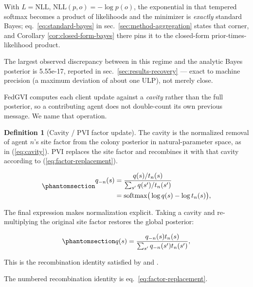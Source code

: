 \documentclass[
  english,
]{article}
\theoremstyle{plain}
\theoremstyle{definition}
\newtheorem{definition}[theorem]{Definition}
\theoremstyle{remark}
\theoremstyle{definition}
\begin{document}
With \(L=\mathrm{NLL}\), \(\mathrm{NLL}(p, o) = -\log p(o)\), the
exponential in that tempered softmax becomes a product of likelihoods
and the minimizer is \emph{exactly} standard Bayes;
eq.~\ref{eq:standard-bayes} in sec.~\ref{sec:method-aggregation} states
that corner, and Corollary \ref{cor:closed-form-bayes} there pins it to
the closed-form prior-times-likelihood product.

The largest observed discrepancy between 
in this regime and the analytic Bayes posterior is 5.55e-17, reported in
sec.~\ref{sec:results-recovery} --- exact to machine precision (a
maximum deviation of about one ULP), not merely close.

FedGVI computes each client update against a \emph{cavity} rather than
the full posterior, so a contributing agent does not double-count its
own previous message. We name that operation.

\begin{definition}[Cavity / PVI factor update]\label{def:cavity}
The cavity is the normalized removal of agent $n$'s site factor from the colony
posterior in natural-parameter space, as in (\ref{eq:cavity}). PVI replaces the
site factor and recombines it with that cavity according to
(\ref{eq:factor-replacement}).
\end{definition}

\begin{equation}\protect\phantomsection\label{eq:cavity}{\begin{aligned}
q_{-n}(s)
&=
\frac{q(s)/t_n(s)}{\sum_{s'} q(s')/t_n(s')}
\\
&=
\operatorname{softmax}\!\big(\log q(s)-\log t_n(s)\big),
\end{aligned}}\end{equation}

The final expression makes normalization explicit. Taking a cavity and
re-multiplying the original site factor restores the global posterior:

\begin{equation}\protect\phantomsection\label{eq:factor-replacement}{q(s)=\frac{q_{-n}(s)t_n(s)}{\sum_{s'}q_{-n}(s')t_n(s')},}\end{equation}

This is the recombination identity satisfied by
 and
.

The numbered recombination identity is eq.~\ref{eq:factor-replacement}.
\end{document}
